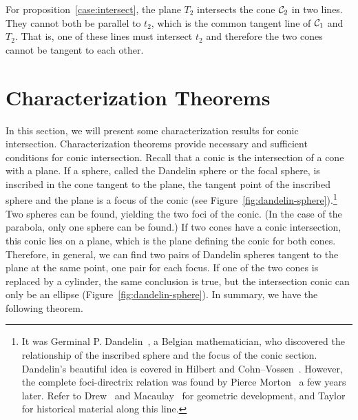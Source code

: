      For proposition~\ref{case:intersect}, the plane $T_2$ intersects the cone
${\cal C}_2$ in two lines.  They cannot both be parallel to $t_2$, which is
the common tangent line of ${\cal C}_1$ and $T_2$.  That is, one of these lines
must intersect $t_2$ and therefore the two cones cannot be tangent to each
other.\ \ \ \QED


\section{Characterization Theorems}
\label{section:characterization}
     In this section, we will present some characterization results for conic
intersection.  Characterization theorems provide necessary and sufficient
conditions for conic intersection.  
Recall that a conic is the intersection of a cone with a plane.
If a sphere, called the Dandelin sphere or the focal sphere, is inscribed in 
the cone tangent to the plane, the tangent point of the inscribed sphere and 
the plane is a focus of the conic (see 
Figure~\ref{fig:dandelin-sphere}).\footnote{It
was Germinal P. Dandelin~\cite{dandelin:1822}, a Belgian mathematician, who
discovered the relationship of the inscribed sphere and the focus of the
conic section.  Dandelin's beautiful idea is covered in 
Hilbert and Cohn--Vossen~\cite{hilbert:1983}.  However, the complete 
foci-directrix relation was found by Pierce Morton~\cite{morton:1830} a few 
years later.  Refer to Drew~\cite{drew:1875} and Macaulay~\cite{macaulay:1895}
for geometric development, and Taylor~\cite{taylor:1881} for historical
material along this line.}  Two spheres can be found, yielding the two foci of
the conic. (In the case of the parabola, only one sphere can be found.)   
If two cones have a conic intersection, this conic lies on a plane, which is 
the plane defining the conic for both cones.  Therefore, in general, we can 
find two pairs of Dandelin spheres tangent to the plane at the same point,
one pair for each focus.  If one of the two cones is replaced by a cylinder, 
the same conclusion is true, but the intersection conic can only be an 
ellipse (Figure~\ref{fig:dandelin-sphere}).  
In summary, we have the following theorem.


